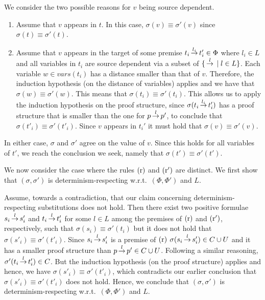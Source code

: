 We consider the two possible reasons for $v$ being source dependent.
\begin{enumerate}
    \item Assume that $v$ appears in $t$. In this case, $\sigma(v)\equiv\sigma'(v)$ since $\sigma(t)\equiv\sigma'(t)$.
    \item Assume that $v$ appears in the target of some premise $t_i \,{\stackrel{{l_i}}{\rightarrow}}\, t_i' \in \Phi$ where $l_i \in L$
          and all variables in $t_i$ are source dependent via  a subset of $\{ \,{\stackrel{{l}}{\rightarrow}}\, \mid l \in  L\}$.
          Each variable $w \in vars(t_i)$ has a distance smaller than that of $v$. Therefore, the induction
          hypothesis (on the distance of variables) applies and we have that $\sigma(w) \equiv\sigma'(w)$.
          This means that $\sigma(t_i)\equiv\sigma'(t_i)$. This allows
          us to apply the induction hypothesis on the proof structure, since $\sigma(t_i \,{\stackrel{{l_i}}{\rightarrow}}\, t_i')$ has a proof structure
          that is smaller than the one for $p \,{\stackrel{{l}}{\rightarrow}}\, p'$, to conclude that $\sigma(t'_i) \equiv \sigma'(t'_i)$.
          Since $v$ appears in $t_i'$ it must hold that $\sigma(v)\equiv\sigma'(v)$.
\end{enumerate}
In either case, $\sigma$ and $\sigma'$ agree on the value of $v$. Since this holds for all variables of $t'$,
we reach the conclusion we seek, namely that $\sigma(t')\equiv\sigma'(t')$.

We now consider the case where the rules $\mathrm{(r)}$ and $\mathrm{(r')}$ are distinct.
We first show that $(\sigma, \sigma')$ is determinism-respecting w.r.t.\ $(\Phi, \Phi')$ and $L$.

Assume,  towards a contradiction, that our claim concerning determinism-respecting substitutions does not hold.
Then there exist  two positive formulae $s_i \,{\stackrel{{l}}{\rightarrow}}\, s'_i$ and $t_i \,{\stackrel{{l}}{\rightarrow}}\, t'_i$ for some $l \in L$ among the premises of $\mathrm{(r)}$ and
$\mathrm{(r')}$, respectively, such that
$\sigma(s_i) \equiv \sigma'(t_i)$ but it does not hold that $\sigma(s'_i) \equiv \sigma'(t'_i)$.
Since $s_i \,{\stackrel{{l}}{\rightarrow}}\, s'_i$  is a premise of $\mathrm{(r)}$ $\sigma(s_i \,{\stackrel{{l}}{\rightarrow}}\, s'_i) \in C \cup U$ and it has a smaller proof structure than $p \,{\stackrel{{l}}{\rightarrow}}\, p' \in C \cup U$. Following a similar reasoning, $\sigma'(t_i \,{\stackrel{{l}}{\rightarrow}}\, t'_i) \in C$.
But the induction hypothesis (on the proof structure) applies and hence, we have $\sigma(s'_i) \equiv \sigma'(t'_i)$, which contradicts our earlier conclusion that $\sigma(s'_i) \equiv \sigma'(t'_i)$ does not hold. Hence, we conclude that  $(\sigma, \sigma')$ is determinism-respecting w.r.t.\ $(\Phi, \Phi')$ and $L$.

